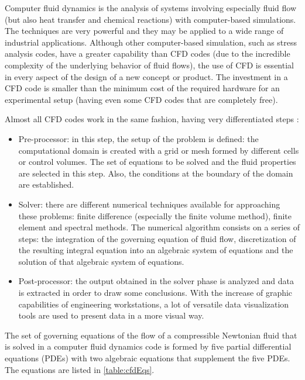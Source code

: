 Computer fluid dynamics is the analysis of systems involving especially fluid flow (but also heat transfer and chemical reactions) with computer-based simulations. The techniques are very powerful and they may be applied to a wide range of industrial applications. Although other computer-based simulation, such as stress analysis codes, have a greater capability than CFD codes (due to the incredible complexity of the underlying behavior of fluid flows), the use of CFD is essential in every aspect of the design of a new concept or product. The investment in a CFD code is smaller than the minimum cost of the required hardware for an experimental setup (having even some CFD codes that are completely free). 

Almost all CFD codes work in the same fashion, having very differentiated steps \cite{versteeg1995computational}:
\begin{itemize}
    \item Pre-processor: in this step, the setup of the problem is defined: the computational domain is created with a grid or mesh formed by different cells or control volumes. The set of equations to be solved and the fluid properties are selected in this step. Also, the conditions at the boundary of the domain are established. 
    \item Solver: there are different numerical techniques available for approaching these problems: finite difference (especially the finite volume method), finite element and spectral methods. The numerical algorithm consists on a series of steps: the integration of the governing equation of fluid flow, discretization of the resulting integral equation into an algebraic system of equations and the solution of that algebraic system of equations. 
    \item Post-processor: the output obtained in the solver phase is analyzed and data is extracted in order to draw some conclusions. With the increase of graphic capabilities of engineering workstations, a lot of versatile data visualization tools are used to present data in a more visual way. 
\end{itemize}

The set of governing equations of the flow of a compressible Newtonian fluid that is solved in a computer fluid dynamics code is formed by five partial differential equations (PDEs) with two algebraic equations that supplement the five PDEs. The equations are listed in
\ref{table:cfdEqs}.

\newpage


